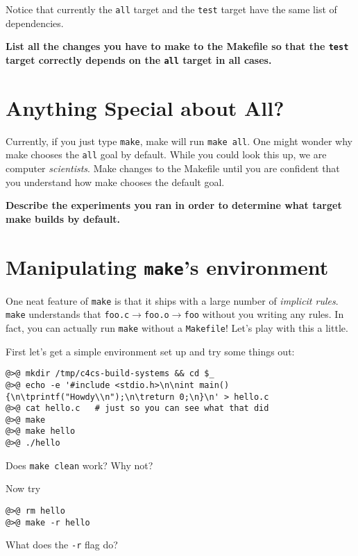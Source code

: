 \documentclass{article}
\begin{document}
Notice that currently the \texttt{all} target and the \texttt{test} target
have the same list of dependencies.

\textbf{List all the changes you have to make to the Makefile so that the
  \texttt{test} target correctly depends on the \texttt{all} target in all
  cases.}
\vspace{3cm}

\section{Anything Special about All?}
\label{q:all}

Currently, if you just type \texttt{make}, make will run \texttt{make all}.
One might wonder why make chooses the \texttt{all} goal by default.
While you could look this up, we are computer \emph{scientists}.
Make changes to the Makefile until you are confident that you understand how
make chooses the default goal.

\textbf{Describe the experiments you ran in order to determine what target
  make builds by default.}
\vspace{3cm}

\newpage

\section{Manipulating \texttt{make}'s environment}

One neat feature of \texttt{make} is that it ships with a large number of
\emph{implicit rules}. \texttt{make} understands that
\texttt{foo.c}$\rightarrow$\texttt{foo.o}$\rightarrow$\texttt{foo} without you
writing any rules. In fact, you can actually run \texttt{make} without a
\texttt{Makefile}! Let's play with this a little.


First let's get a simple environment set up and try some things out:
\begin{lstlisting}
@>@ mkdir /tmp/c4cs-build-systems && cd $_
@>@ echo -e '#include <stdio.h>\n\nint main() {\n\tprintf("Howdy\\n");\n\treturn 0;\n}\n' > hello.c
@>@ cat hello.c   # just so you can see what that did
@>@ make
@>@ make hello
@>@ ./hello
\end{lstlisting}
Does \texttt{make clean} work? Why not?

Now try
\begin{lstlisting}
@>@ rm hello
@>@ make -r hello
\end{lstlisting}
What does the \texttt{-r} flag do?
\end{document}
